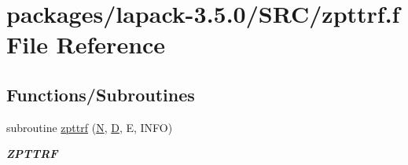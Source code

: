 \hypertarget{zpttrf_8f}{}\section{packages/lapack-\/3.5.0/\+S\+R\+C/zpttrf.f File Reference}
\label{zpttrf_8f}
\subsection*{Functions/\+Subroutines}
\begin{DoxyCompactItemize}
\item 
subroutine \hyperlink{group__complex16PTcomputational_gac66038080132a6b116df577c91e3a39d}{zpttrf} (\hyperlink{polmisc_8c_a0240ac851181b84ac374872dc5434ee4}{N}, \hyperlink{odrpack_8h_a7dae6ea403d00f3687f24a874e67d139}{D}, E, I\+N\+F\+O)
\begin{DoxyCompactList}\small\item\em {\bfseries Z\+P\+T\+T\+R\+F} \end{DoxyCompactList}\end{DoxyCompactItemize}
